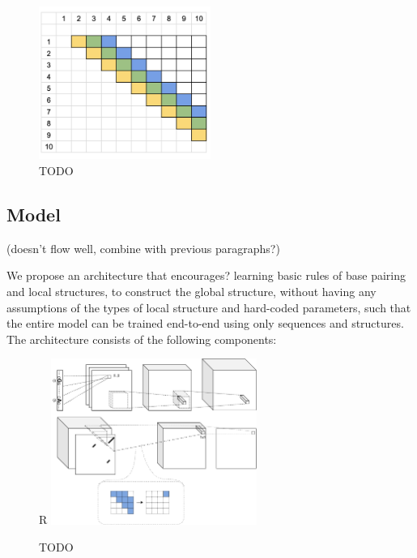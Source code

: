 \documentclass{article}
\begin{document}
\begin{figure}[h!]
    \centering
    \includegraphics[width=0.5\textwidth]{plot/autoregressive_direction.png}
    \caption{TODO}
    \label{fig:autoregressive_direction}
    \centering
\end{figure}




\subsection{Model}

(doesn't flow well, combine with previous paragraphs?)

We propose an architecture that encourages? learning
basic rules of base pairing and local structures, to construct the global structure,
without having any assumptions of the types of local structure and hard-coded parameters,
such that the entire model can be trained end-to-end using only sequences and structures.
The architecture consists of the following components:

\begin{figure}{R}
        \centering
        \includegraphics[width=0.6\textwidth]{plot/nn_arch_1.pdf}
        \caption{TODO}
        \label{fig:nn_arch_1}
        \centering
\end{figure}
\end{document}
